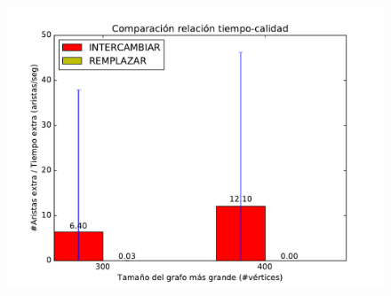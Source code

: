 \begin{figure}[H]
\begin{minipage}{0.49\textwidth}
  \centering
    \includegraphics[width=1\textwidth]{graficos/problema_5/cociente0-4.pdf}
  \caption{}
  \label{fig:cociente3}
\end{minipage}%

\end{figure}



